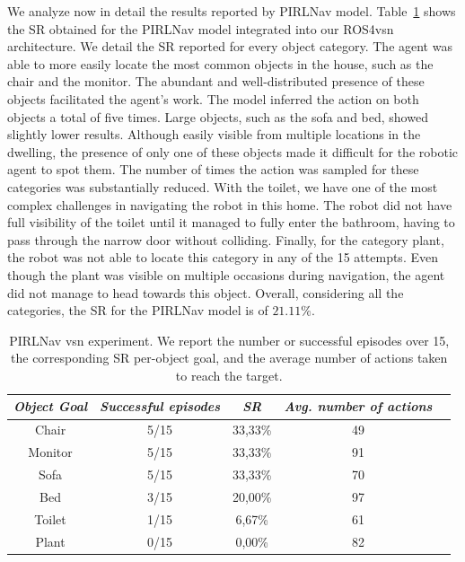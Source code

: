 We analyze now in detail the results reported by PIRLNav model.
Table~\ref{tab:pirlnav} shows the SR obtained for the PIRLNav model integrated into our ROS4\acrshort{vsn} architecture.
We detail the SR reported for every object category.
The agent was able to more easily locate the most common objects in the house, such as the chair and the monitor.
The abundant and well-distributed presence of these objects facilitated the agent's work.
The model inferred the action \stopac on both objects a total of five times.
Large objects, such as the sofa and bed, showed slightly lower results.
Although easily visible from multiple locations in the dwelling, the presence of only one of these objects made it difficult for the robotic agent to spot them.
The number of times the \stopac action was sampled for these categories was substantially reduced.
With the toilet, we have one of the most complex challenges in navigating the robot in this home.
The robot did not have full visibility of the toilet until it managed to fully enter the bathroom, having to pass through the narrow door without colliding.
Finally, for the category plant, the robot was not able to locate this category in any of the 15 attempts.
Even though the plant was visible on multiple occasions during navigation, the agent did not manage to head towards this object.
Overall, considering all the categories, the SR for the PIRLNav model is of $21.11\%$.


\begin{table}[t]
\centering
\begin{tabular}{c|cccc}
\toprule
\textit{\textbf{Object Goal}} & \textit{\textbf{Successful episodes}} & \textit{\textbf{SR}} &  \textit{\textbf{Avg. number of actions}}   \\ \midrule
Chair                & 5/15     & 33,33\%   &   49  \\
Monitor              & 5/15     & 33,33\%   &   91  \\
Sofa                 & 5/15     & 33,33\%   &   70  \\
Bed                  & 3/15     & 20,00\%   &   97  \\
Toilet               & 1/15     & 6,67\%    &   61  \\
Plant                & 0/15     & 0,00\%    &   82  \\ \bottomrule
\end{tabular}
\caption{PIRLNav \acrshort{vsn} experiment. We report the number or successful episodes over 15, the corresponding SR per-object goal, and the average number of actions taken to reach the target.}
\label{tab:pirlnav}
\end{table}

